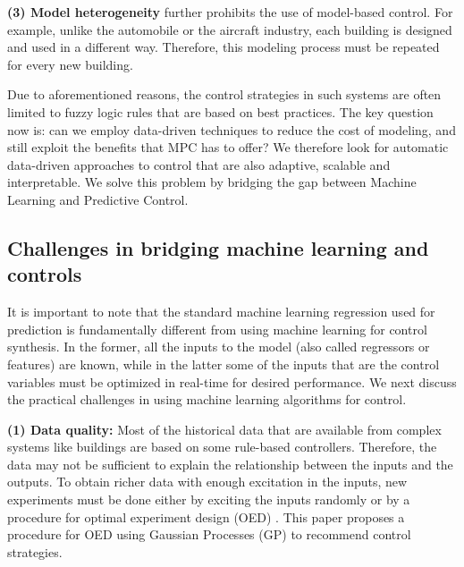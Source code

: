 \noindent \textbf{(3) Model heterogeneity} further prohibits the use of model-based control. For example, unlike the automobile or the aircraft industry, each building is designed and used in a different way. Therefore, this modeling process must be repeated for every new building. 

Due to aforementioned reasons, the control strategies in such systems are often limited to fuzzy logic rules that are based on best practices. The key question now is: can we employ data-driven techniques to reduce the cost of modeling, and still exploit the benefits that MPC has to offer?
We therefore look for automatic data-driven approaches to control that are also adaptive, scalable and interpretable.
We solve this problem by bridging the gap between Machine Learning and Predictive Control.

\subsection{Challenges in bridging machine learning and controls}
\label{SS:practical_challenges}


It is important to note that the standard machine learning regression used for prediction is fundamentally different from using machine learning for control synthesis. In the former, all the inputs to the model (also called regressors or features) are known, while in the latter some of the inputs that are the control variables must be optimized in real-time for desired performance. 
We next discuss the practical challenges in using machine learning algorithms for control.

\noindent \textbf{(1) Data quality:} Most of the historical data that are available from complex systems like buildings are based on some rule-based controllers. 
Therefore, the data may not be sufficient to explain the relationship between the inputs and the outputs. 
To obtain richer data with enough excitation in the inputs, new experiments must be done either by exciting the inputs randomly or by a procedure for optimal experiment design (OED) \cite{Emery1998,Fedorov2010}. 
This paper proposes a procedure for OED using Gaussian Processes (GP) to recommend control strategies.

